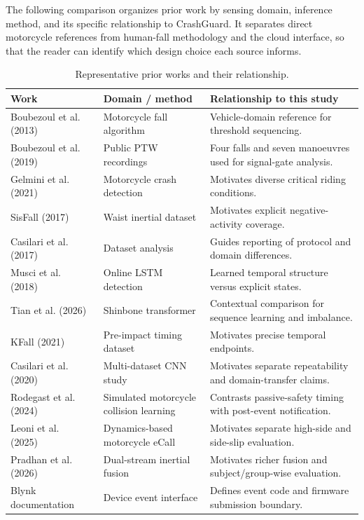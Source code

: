\documentclass[10pt,a4paper]{article}
\begin{document}
The following comparison organizes prior work by sensing domain, inference method, and its specific relationship to CrashGuard. It separates direct motorcycle references from human-fall methodology and the cloud interface, so that the reader can identify which design choice each source informs.

\begin{table}[H]\centering\small
\caption{Representative prior works and their relationship.}\label{tab:prior}
\begin{tabularx}{\linewidth}{@{}>{\raggedright\arraybackslash}p{.21\linewidth}>{\raggedright\arraybackslash}p{.25\linewidth}X@{}}\toprule
Work & Domain / method & Relationship to this study\\\midrule
Boubezoul et al. (2013)~\cite{boubezoul2013algorithm} & Motorcycle fall algorithm & Vehicle-domain reference for threshold sequencing.\\
Boubezoul et al. (2019)~\cite{boubezoul2019dataset} & Public PTW recordings & Four falls and seven manoeuvres used for signal-gate analysis.\\
Gelmini et al. (2021)~\cite{gelmini2021novel} & Motorcycle crash detection & Motivates diverse critical riding conditions.\\
SisFall (2017)~\cite{sisfall} & Waist inertial dataset & Motivates explicit negative-activity coverage.\\
Casilari et al. (2017)~\cite{survey} & Dataset analysis & Guides reporting of protocol and domain differences.\\
Musci et al. (2018)~\cite{musci} & Online LSTM detection & Learned temporal structure versus explicit states.\\
Tian et al. (2026)~\cite{tian2026transformer} & Shinbone transformer & Contextual comparison for sequence learning and imbalance.\\
KFall (2021)~\cite{kfall} & Pre-impact timing dataset & Motivates precise temporal endpoints.\\
Casilari et al. (2020)~\cite{cnn} & Multi-dataset CNN study & Motivates separate repeatability and domain-transfer claims.\\
Rodegast et al. (2024)~\cite{rodegast2024} & Simulated motorcycle collision learning & Contrasts passive-safety timing with post-event notification.\\
Leoni et al. (2025)~\cite{ecall2025} & Dynamics-based motorcycle eCall & Motivates separate high-side and side-slip evaluation.\\
Pradhan et al. (2026)~\cite{dual2026} & Dual-stream inertial fusion & Motivates richer fusion and subject/group-wise evaluation.\\
Blynk documentation~\cite{blynkevents} & Device event interface & Defines event code and firmware submission boundary.\\\bottomrule
\end{tabularx}\end{table}
\end{document}
